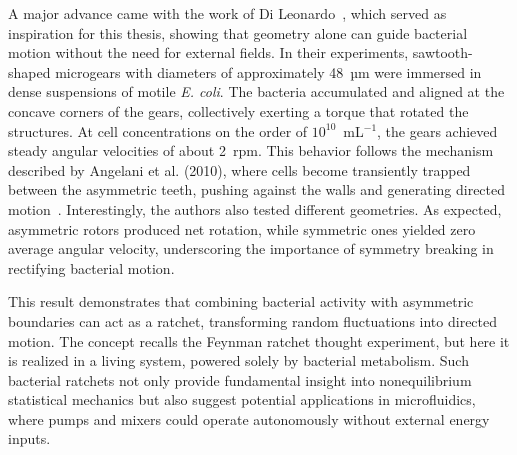 A major advance came with the work of Di Leonardo~\cite{di2010bacterial}, which served as inspiration for this thesis, showing that geometry alone can guide bacterial motion without the need for external fields. In their experiments, sawtooth-shaped microgears with diameters of approximately 48~µm were immersed in dense suspensions of motile \textit{E. coli}. The bacteria accumulated and aligned at the concave corners of the gears, collectively exerting a torque that rotated the structures. At cell concentrations on the order of $10^{10}$~mL$^{-1}$, the gears achieved steady angular velocities of about 2~rpm. This behavior follows the mechanism described by Angelani et al. (2010), where cells become transiently trapped between the asymmetric teeth, pushing against the walls and generating directed motion~\cite{angelani2010geometrically}. 
Interestingly, the authors also tested different geometries. As expected, asymmetric rotors produced net rotation, while symmetric ones yielded zero average angular velocity, underscoring the importance of symmetry breaking in rectifying bacterial motion. 

This result demonstrates that combining bacterial activity with asymmetric boundaries can act as a ratchet, transforming random fluctuations into directed motion. The concept recalls the Feynman ratchet thought experiment, but here it is realized in a living system, powered solely by bacterial metabolism. Such bacterial ratchets not only provide fundamental insight into nonequilibrium statistical mechanics but also suggest potential applications in microfluidics, where pumps and mixers could operate autonomously without external energy inputs.


